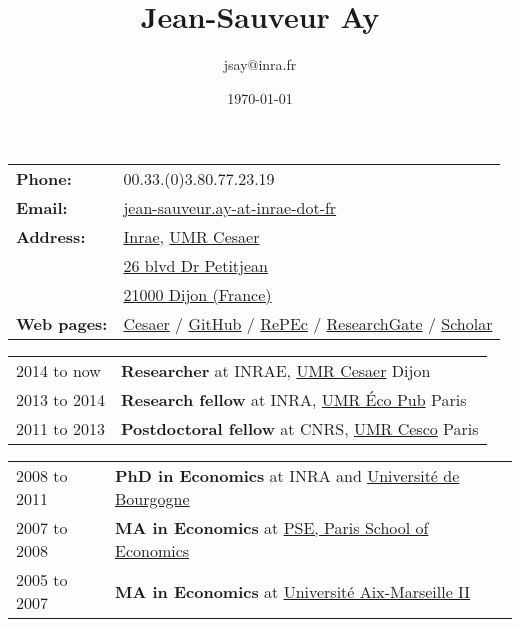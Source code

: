 \documentclass[11pt, a4paper]{./style}
\author{jsay@inra.fr}
\date{\today}
\title{Jean-Sauveur Ay}
\begin{document}
\maketitle


\label{sec:orge2e0bfe}

\begin{center}
\begin{tabular}{ll}
\textbf{Phone:} & 00.33.(0)3.80.77.23.19\\
\textbf{Email:} & \href{mailto:jean-sauveur.ay@inrae.fr}{jean-sauveur.ay-at-inrae-dot-fr}\\
\textbf{Address:} & \href{https://www.inrae.fr/en/about-us}{Inrae}, \href{https://www2.dijon.inrae.fr/cesaer/en/axis/}{UMR Cesaer}\\
 & \href{https://www.google.com/maps/?q\%3D47.3097819,5.0644835}{26 blvd Dr Petitjean}\\
 & \href{https://www.google.com/maps/place/21000+Dijon/}{21000 Dijon (France)}\\
\textbf{Web pages:} & \href{https://www2.dijon.inrae.fr/cesaer/membres/jean-sauveur-ay/}{Cesaer} / \href{http://github.com/jsay/}{GitHub} / \href{https://ideas.repec.org/e/pay77.html}{RePEc} / \href{https://www.researchgate.net/profile/Jean\_Sauveur\_Ay}{ResearchGate} / \href{https://scholar.google.fr/citations?user=arEwxlIAAAAJ\&hl=fr}{Scholar}\\
\end{tabular}
\end{center}

\label{sec:org2fa30d4}

\begin{center}
\begin{tabular}{ll}
2014 to now & \textbf{Researcher} at INRAE, \href{https://www2.dijon.inrae.fr/cesaer/en/axis/}{UMR Cesaer} Dijon\\
2013 to 2014 & \textbf{Research fellow} at INRA, \href{https://www6.versailles-grignon.inrae.fr/economie\_publique\_eng/}{UMR Éco Pub} Paris\\
2011 to 2013 & \textbf{Postdoctoral fellow} at CNRS, \href{http://cesco.mnhn.fr/en}{UMR Cesco} Paris\\
\end{tabular}
\end{center}

\label{sec:org54ecd58}

\begin{center}
\begin{tabular}{ll}
2008 to 2011 & \textbf{PhD in Economics} at INRA and \href{http://en.u-bourgogne.fr/}{Université de Bourgogne}\\
2007 to 2008 & \textbf{MA in Economics} at \href{https://www.parisschoolofeconomics.eu/en/}{PSE, Paris School of Economics}\\
2005 to 2007 & \textbf{MA in Economics} at \href{https://www.amse-aixmarseille.fr/en}{Université Aix-Marseille II}\\
\end{tabular}
\end{center}
\end{document}
